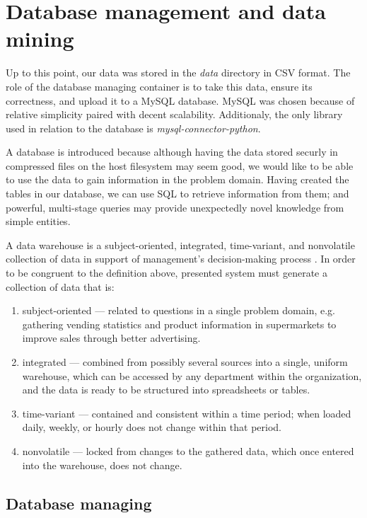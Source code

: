 \chapter{Database management and data mining}

\label{ch:database}
Up to this point, our data was stored in the \textit{data} directory in CSV format. The role of the database managing container is to take this data, ensure its correctness, and upload it to a MySQL database. MySQL was chosen because of relative simplicity paired with decent scalability. Additionaly, the only library used in relation to the database is \textit{mysql-connector-python}. \par
A database is introduced because although having the data stored securly in compressed files on the host filesystem may seem good, we would like to be able to use the data to gain information in the problem domain. Having created the tables in our database, we can use SQL to retrieve information from them; and powerful, multi-stage queries may provide unexpectedly novel knowledge from simple entities. \par
A data warehouse is a subject-oriented, integrated, time-variant, and nonvolatile collection of data in support of management's decision-making process \cite{dataWarehouseMining}. In order to be congruent to the definition above, presented system must generate a collection of data that is:

\begin{enumerate}
    \item subject-oriented --- related to questions in a single problem domain, e.g. gathering vending statistics and product information in supermarkets to improve sales through better advertising.
    \item integrated --- combined from possibly several sources into a single, uniform warehouse, which can be accessed by any department within the organization, and the data is ready to be structured into spreadsheets or tables.
    \item time-variant --- contained and consistent within a time period; when loaded daily, weekly, or hourly does not change within that period.
    \item nonvolatile --- locked from changes to the gathered data, which once entered into the warehouse, does not change.
\end{enumerate}

\section{Database managing}

